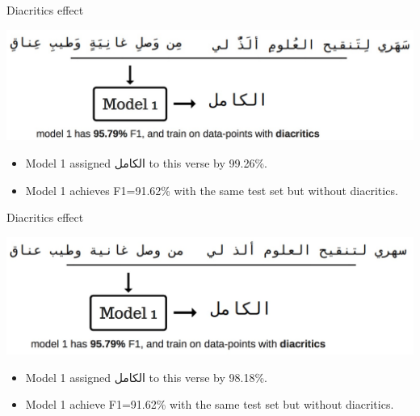 \documentclass[10pt]{beamer}
\begin{document}
\begin{frame}[fragile]{Diacritics effect}
\begin{center}
\includegraphics[scale=0.2]{fig8.png}
    
\end{center}

\begin{itemize}
    \item Model 1 assigned \textarabic{الكامل}  to this verse by 99.26\%.
    \item Model 1 achieves F1=91.62\% with the same test set but without diacritics.
\end{itemize}
\end{frame}


\begin{frame}[fragile]{Diacritics effect}
\begin{center}
\includegraphics[scale=0.2]{fig9.png}
\end{center}

\begin{itemize}
    \item Model 1 assigned \textarabic{الكامل}  to this verse by 98.18\%.
    \item Model 1 achieve F1=91.62\% with the same test set but without diacritics.
\end{itemize}
\end{frame}
\end{document}
